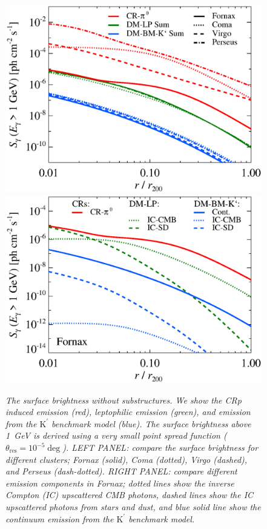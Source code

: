 \documentclass[10pt,aps,pra,reprint,amsmath,amsfonts,amssymb,showpacs]{revtex4-1}
\newcommand{\rmn}{\mathrm}
\newcommand{\psf}{\theta_\rmn{res}}
\newcommand{\Kp}{\rmn{K}^\prime}
\begin{document}
\begin{figure}
\begin{minipage}{2.0\columnwidth}
  \includegraphics[width=0.49\columnwidth]{figures/SB.v11.1GeV.SF300.noSuB.elmu.eps}
  \includegraphics[width=0.49\columnwidth]{figures/SB.fornax.v11.1GeV.SF300.noSuB.elmu.eps}
\caption{\it The surface brightness without substructures. We show the
  CRp induced emission (red), leptophilic emission (green), and
  emission from the $\Kp$ benchmark model (blue). The surface
  brightness above 1~GeV is derived using a very small point spread
  function ($\psf=10^{-5}\deg$). LEFT PANEL: compare the
  surface brightness for different clusters; Fornax (solid), Coma
  (dotted), Virgo (dashed), and Perseus (dash-dotted). RIGHT PANEL:
  compare different emission components in Fornax; dotted lines show
  the inverse Compton (IC) upscattered CMB photons, dashed lines show
  the IC upscattered photons from stars and dust, and blue solid line
  show the continuum emission from the $\Kp$ benchmark
  model.}
 \label{fig:SB_clu_nosub}
\end{minipage}
\end{figure}
\end{document}
